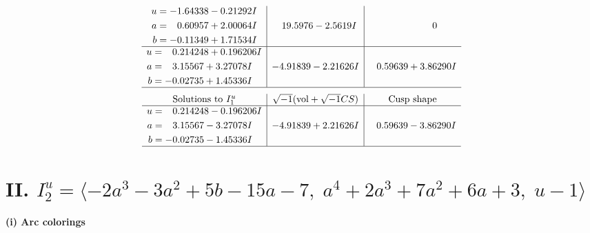 \documentclass[1p]{elsarticle_modified}
\theoremstyle{definition}
\newcommand{\I}{\sqrt{-1}}
\begin{document}
$$\begin{array}{c|c|c}
\begin{aligned}
u &= -1.64338 - 0.21292 I \\
a &= \phantom{-}0.60957 + 2.00064 I \\
b &= -0.11349 + 1.71534 I\end{aligned}
 & \phantom{-}19.5976 - 2.5619 I & \phantom{-0.000000 } 0 \\ \hline\begin{aligned}
u &= \phantom{-}0.214248 + 0.196206 I \\
a &= \phantom{-}3.15567 + 3.27078 I \\
b &= -0.02735 + 1.45336 I\end{aligned}
 & -4.91839 - 2.21626 I & \phantom{-}0.59639 + 3.86290 I\\
 \hline 
 \end{array}$$\newpage$$\begin{array}{c|c|c}  
\text{Solutions to }I^u_{1}& \I (\text{vol} + \sqrt{-1}CS) & \text{Cusp shape}\\
 \hline 
\begin{aligned}
u &= \phantom{-}0.214248 - 0.196206 I \\
a &= \phantom{-}3.15567 - 3.27078 I \\
b &= -0.02735 - 1.45336 I\end{aligned}
 & -4.91839 + 2.21626 I & \phantom{-}0.59639 - 3.86290 I\\
 \hline 
 \end{array}$$\newpage\newpage\renewcommand{\arraystretch}{1}
\centering \section*{II. $I^u_{2}= \langle -2 a^3-3 a^2+5 b-15 a-7,\;a^4+2 a^3+7 a^2+6 a+3,\;u-1 \rangle$}
\flushleft \textbf{(i) Arc colorings}\\
\end{document}
